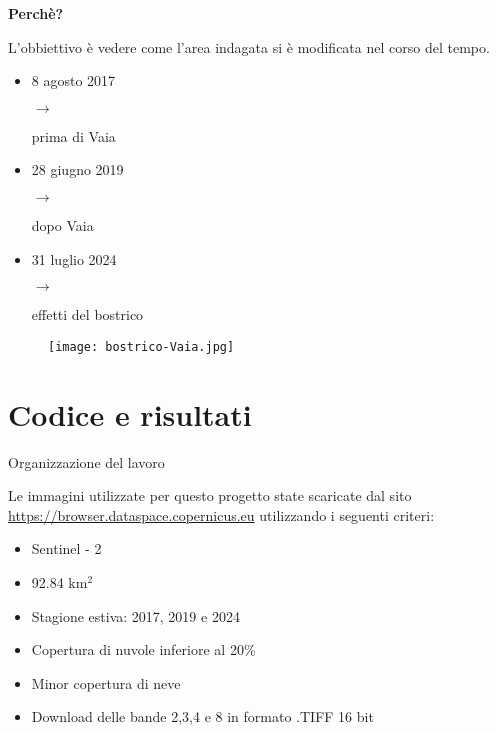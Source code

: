 \documentclass{beamer} %
\begin{document}
\begin{frame}{\textbf{Perchè?} }

L'obbiettivo è vedere come l'area indagata si è modificata nel corso del tempo.
\begin{multicols}{2}
\begin{itemize}
    \item 8 agosto 2017 \begin{large} $\rightarrow$ \end{large} prima di Vaia
    \item 28 giugno 2019 \begin{large} $\rightarrow$ \end{large} dopo Vaia
    \item 31 luglio 2024 \begin{large} $\rightarrow$ \end{large} effetti del  bostrico
\end{itemize}
\columnbreak
                \begin{center}
                \begin{figure}
                    \centering
                    \texttt{[image: bostrico-Vaia.jpg]}
                \end{figure}
                \end{center}
\end{multicols}
\end{frame}


\section{Codice e risultati}

        \begin{frame}{Organizzazione del lavoro}
            \begin{center}
            Le immagini utilizzate per questo progetto state scaricate dal sito \url{https://browser.dataspace.copernicus.eu} utilizzando i seguenti criteri: \begin{itemize}
                    \item Sentinel - 2
                    \item 92.84 km$^{2}$
                    \item Stagione estiva: 2017, 2019 e 2024
                    \item Copertura di nuvole inferiore al 20\%
                    \item Minor copertura di neve
                    \item Download delle bande 2,3,4 e 8 in formato .TIFF 16 bit
                \end{itemize}
            \end{center}
        \end{frame}
\end{document}
